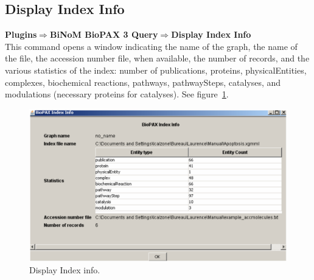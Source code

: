 \subsection{Display Index Info}
\textbf{Plugins$\Rightarrow$BiNoM BioPAX 3 Query$\Rightarrow$Display Index Info}\\
This command opens a window indicating the name of the graph, the name of the file, the accession number file, when available, the number of records, and the various statistics of the index: number of publications, proteins, physicalEntities, complexes, biochemical reactions, pathways, pathwaySteps, catalyses, and modulations (necessary proteins for catalyses). See figure~\ref{BioPAX_Index_Info}.
\begin{figure}[h]
\centering
\includegraphics[width=18 cm]{graphics/BioPAX_Index_Info}
\caption{Display Index info.}
\label{BioPAX_Index_Info}
\end{figure}

